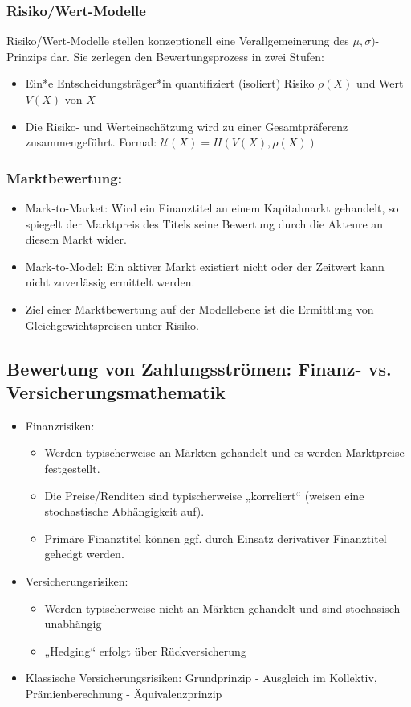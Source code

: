 \documentclass[12pt]{report}
\theoremstyle{dotless}
\theoremstyle{definition}
\begin{document}
\subsubsection{Risiko/Wert-Modelle}

Risiko/Wert-Modelle stellen konzeptionell eine Verallgemeinerung des
$\mu, \sigma)$-Prinzips dar. Sie zerlegen den Bewertungsprozess in zwei Stufen:
\begin{itemize}
\item Ein*e Entscheidungsträger*in quantifiziert (isoliert) Risiko $\rho (X)$ und
Wert $V(X)$ von $X$
\item Die Risiko- und Werteinschätzung wird zu einer Gesamtpräferenz
zusammengeführt. Formal: $\mathcal{U}(X) = H(V(X), \rho(X))$
\end{itemize}


\subsubsection{Marktbewertung:}
\begin{itemize}
\item Mark-to-Market: Wird ein Finanztitel an einem Kapitalmarkt gehandelt, so spiegelt der Marktpreis des Titels seine Bewertung durch die Akteure an diesem Markt wider.
\item Mark-to-Model: Ein aktiver Markt existiert nicht oder der Zeitwert kann nicht zuverlässig
ermittelt werden.
\item Ziel einer Marktbewertung auf der Modellebene ist die Ermittlung von
Gleichgewichtspreisen unter Risiko.
\end{itemize}

\subsection{Bewertung von Zahlungsströmen: Finanz- vs. Versicherungsmathematik}
\begin{itemize}
\item Finanzrisiken:
\begin{itemize}
\item Werden typischerweise an Märkten gehandelt und es werden Marktpreise
festgestellt.
\item Die Preise/Renditen sind typischerweise „korreliert“ (weisen eine stochastische
Abhängigkeit auf).
\item Primäre Finanztitel können ggf. durch Einsatz derivativer Finanztitel gehedgt
werden.
\end{itemize}
\item Versicherungsrisiken:
\begin{itemize}
\item Werden typischerweise nicht an Märkten gehandelt und sind stochasisch unabhängig
\item „Hedging“ erfolgt über Rückversicherung
\end{itemize}
\item Klassische Versicherungsrisiken: Grundprinzip - Ausgleich im Kollektiv, Prämienberechnung - Äquivalenzprinzip
\end{itemize}
\end{document}
